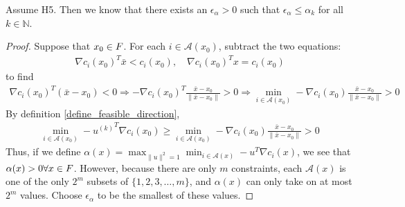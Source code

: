 \begin{lemma}
\label{alphas_are_bounded}
Assume H5. Then we know that there exists an  $\epsilon_{\alpha} > 0$ such that $\epsilon_{\alpha} \le \alpha_k$ for all $k \in \mathbb N$.
\end{lemma}
\begin{proof}
Suppose that $x_0 \in {F}$.
For each $i \in \mathcal A(x_0)$, subtract the two equations:
\begin{align*}
\nabla c_i(x_0)^T \bar x < c_i(x_0), \quad
\nabla c_i(x_0)^T  x = c_i(x_0)
\end{align*}
to find
\begin{align*}
\nabla c_i(x_0)^T \left(\bar x - x_0 \right) < 0 \Longrightarrow -\nabla c_i(x_0)^T \frac {\bar x - x_0}{\|\bar x - x_0\|} > 0 
\Longrightarrow \min_{i \in \mathcal A(x_0)} - \nabla c_i(x_0)\frac {\bar x - x_0}{\|\bar x - x_0\|} > 0
\end{align*}
By definition \cref{define_feasible_direction},
\begin{align*}
\min_{i \in \mathcal A(x_0)} - {u^{(k)}}^T \nabla c_i(x_0) \ge \min_{i \in \mathcal A(x_0)} - \nabla c_i(x_0)\frac {\bar x - x_0}{\|\bar x - x_0\|} > 0
\end{align*}
Thus, if we define $\alpha(x) =  \max_{\|u\|^2 = 1} \min_{i \in \mathcal A(x)} - u^T \nabla c_i(x) $, we see that $\alpha(x) > 0 \forall x \in {F}$.
However, because there are only $m$ constraints, each $\mathcal A(x)$ is one of the only $2^m$ subsets of  $\{1, 2, 3, \ldots, m\}$,
and $\alpha(x)$ can only take on at most $2^m$ values.
Choose $\epsilon_{\alpha}$ to be the smallest of these values.
\end{proof}









